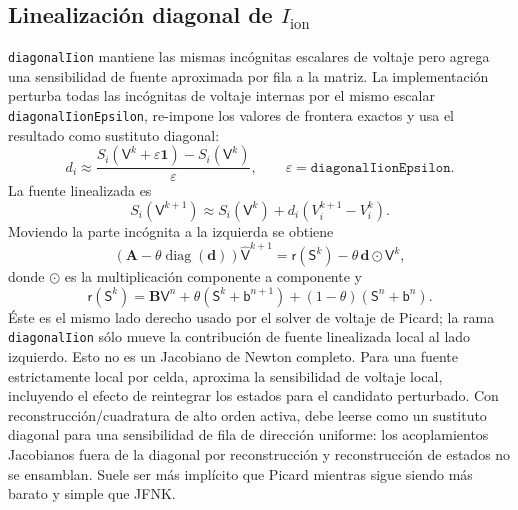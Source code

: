 \documentclass[11pt,a4paper]{article}
\newcommand{\code}[1]{\texttt{\small #1}}
\newcommand{\Iion}{I_{\mathrm{ion}}}
\newcommand{\Aimp}{\mathbf{A}}
\newcommand{\Bimp}{\mathbf{B}}
\begin{document}
\subsection{Linealización diagonal de \texorpdfstring{$\Iion$}{Iion}}
\label{sec:diagonal}

\code{diagonalIion} mantiene las mismas incógnitas escalares de voltaje pero agrega una
sensibilidad de fuente aproximada por fila a la matriz. La implementación perturba todas las
incógnitas de voltaje internas por el mismo escalar \code{diagonalIionEpsilon}, re-impone los
valores de frontera exactos y usa el resultado como sustituto diagonal:
\begin{equation}
  d_i
  \approx
  \frac{S_i(\mathsf{V}^k+\varepsilon\mathbf{1})-S_i(\mathsf{V}^k)}
       {\varepsilon},
  \qquad
  \varepsilon=\texttt{diagonalIionEpsilon}.
  \label{eq:diagonal-derivative}
\end{equation}
La fuente linealizada es
\begin{equation}
  S_i(\mathsf{V}^{k+1})
  \approx
  S_i(\mathsf{V}^{k})
  + d_i\left(V^{k+1}_i-V^k_i\right).
\end{equation}
Moviendo la parte incógnita a la izquierda se obtiene
\begin{equation}
  \left(\Aimp-\theta\operatorname{diag}(\mathbf{d})\right)
  \widehat{\mathsf{V}}^{k+1}
  =
  \mathsf{r}(\mathsf{S}^k)
  -
  \theta\,\mathbf{d}\odot\mathsf{V}^{k},
  \label{eq:diagonal-system}
\end{equation}
donde $\odot$ es la multiplicación componente a componente y
\begin{equation}
  \mathsf{r}(\mathsf{S}^{k})
  =
  \Bimp\mathsf{V}^{n}
  +\theta\left(\mathsf{S}^{k}+\mathsf{b}^{n+1}\right)
  +(1-\theta)\left(\mathsf{S}^{n}+\mathsf{b}^{n}\right).
\end{equation}
Éste es el mismo lado derecho usado por el solver de voltaje de Picard; la rama
\code{diagonalIion} sólo mueve la contribución de fuente linealizada local al lado izquierdo.
Esto no es un Jacobiano de Newton completo. Para una fuente estrictamente local por celda,
aproxima la sensibilidad de voltaje local, incluyendo el efecto de reintegrar los estados
para el candidato perturbado. Con reconstrucción/cuadratura de alto orden activa, debe
leerse como un sustituto diagonal para una sensibilidad de fila de dirección uniforme: los
acoplamientos Jacobianos fuera de la diagonal por reconstrucción y reconstrucción de estados
no se ensamblan. Suele ser más implícito que Picard mientras sigue siendo más barato y
simple que JFNK.
\end{document}
